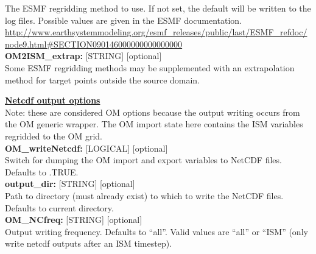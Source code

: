 \documentclass[11pt]{article}
\begin{document}
\begin{flushleft}
The ESMF regridding method to use.  If not set, the default will be 
written to the log files.  Possible values are given in the ESMF 
documentation. 
\url{http://www.earthsystemmodeling.org/esmf_releases/public/last/ESMF_refdoc/node9.html#SECTION090146000000000000000}                                        \\
\vspace{6pt}
\textbf{OM2ISM\_extrap:}       [STRING] [optional]                         \\
Some ESMF regridding methods may be supplemented with an extrapolation
method for target points outside the source domain.                        \\
\vspace{6pt}

\vspace{16pt}


\textbf{\underline{Netcdf output options}}                                 \\
Note: these are considered OM options because the output writing occurs 
from the OM generic wrapper.  The OM import state here contains the 
ISM variables regridded to the OM grid.                                    \\
\vspace{6pt}
\textbf{OM\_writeNetcdf:}   [LOGICAL] [optional]                           \\
Switch for dumping the OM import and export variables to NetCDF files.
Defaults to .TRUE.                                                         \\
\vspace{6pt}
\textbf{output\_dir:}  [STRING] [optional]                                 \\
Path to directory (must already exist) to which to write the NetCDF files. 
Defaults to current directory.                                             \\
\vspace{6pt}
\textbf{OM\_NCfreq:}  [STRING] [optional]                                 \\
Output writing frequency.
Defaults to ``all''.  Valid values are ``all'' or ``ISM'' (only write 
netcdf outputs after an ISM timestep).
\vspace{22pt}


\end{flushleft}
\end{document}
